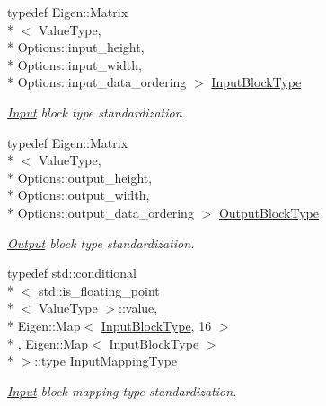 \begin{DoxyCompactItemize}
\item 
typedef Eigen\-::\-Matrix\\*
$<$ Value\-Type, \\*
Options\-::input\-\_\-height, \\*
Options\-::input\-\_\-width, \\*
Options\-::input\-\_\-data\-\_\-ordering $>$ \hyperlink{structffnn_1_1layer_1_1hidden_1_1extrinsics_af5299a48a27726ba0d407ecb28890092}{Input\-Block\-Type}
\begin{DoxyCompactList}\small\item\em \hyperlink{classffnn_1_1layer_1_1_input}{Input} block type standardization. \end{DoxyCompactList}\item 
typedef Eigen\-::\-Matrix\\*
$<$ Value\-Type, \\*
Options\-::output\-\_\-height, \\*
Options\-::output\-\_\-width, \\*
Options\-::output\-\_\-data\-\_\-ordering $>$ \hyperlink{structffnn_1_1layer_1_1hidden_1_1extrinsics_ac5ca721e2e5843ddcf90351b59c4e56e}{Output\-Block\-Type}
\begin{DoxyCompactList}\small\item\em \hyperlink{classffnn_1_1layer_1_1_output}{Output} block type standardization. \end{DoxyCompactList}\item 
typedef std\-::conditional\\*
$<$ std\-::is\-\_\-floating\-\_\-point\\*
$<$ Value\-Type $>$\-::value, \\*
Eigen\-::\-Map$<$ \hyperlink{structffnn_1_1layer_1_1hidden_1_1extrinsics_af5299a48a27726ba0d407ecb28890092}{Input\-Block\-Type}, 16 $>$\\*
, Eigen\-::\-Map$<$ \hyperlink{structffnn_1_1layer_1_1hidden_1_1extrinsics_af5299a48a27726ba0d407ecb28890092}{Input\-Block\-Type} $>$\\*
 $>$\-::type \hyperlink{structffnn_1_1layer_1_1hidden_1_1extrinsics_a62256f740b1aaf253c9992d15cda7eab}{Input\-Mapping\-Type}
\begin{DoxyCompactList}\small\item\em \hyperlink{classffnn_1_1layer_1_1_input}{Input} block-\/mapping type standardization. \end{DoxyCompactList}\item 

\end{DoxyCompactItemize}
